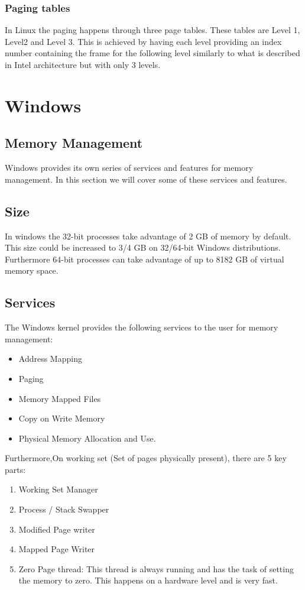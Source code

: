 \documentclass[journal,10pt,onecolumn,compsoc,letterpaper,draftclsnofoot,table,xcdraw]{IEEEtran} \usepackage[margin=0.75in]{geometry}
\begin{document}
\subsubsection{Paging tables}
\noindent In Linux the paging happens through three page tables. These tables are Level 1, Level2 and Level 3. This is achieved by having each level providing an index number containing the frame for the following level similarly to what is described in Intel architecture but with only 3 levels.
\section{Windows}
\subsection{Memory Management}
\noindent Windows provides its own series of services and features for memory management. In this section we will cover some of these services and features.
\subsection{Size}
\noindent In windows the 32-bit processes take advantage of 2 GB of memory by default. This size could be increased to 3/4 GB on 32/64-bit Windows distributions. Furthermore 64-bit processes can take advantage of up to 8182 GB of virtual memory space.
\subsection{Services}
\noindent The Windows kernel provides the following services to the user for memory management:
\begin{itemize}
\item Address Mapping
\item Paging
\item Memory Mapped Files
\item Copy on Write Memory
\item Physical Memory Allocation and Use.
\end{itemize}
\noindent Furthermore,On working set (Set of pages physically present), there are 5 key parts:
\begin{enumerate}
\item Working Set Manager
\item Process / Stack Swapper
\item Modified Page writer
\item Mapped Page Writer
\item Zero Page thread: This thread is always running and has the task of setting the memory to zero. This happens on a hardware level and is very fast.
\end{enumerate}
\end{document}
